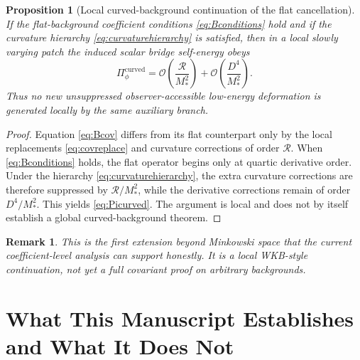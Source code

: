\documentclass[11pt]{article}
\newtheorem{proposition}{Proposition}
\newtheorem{remark}{Remark}
\begin{document}
\begin{proposition}[Local curved-background continuation of the flat cancellation]
If the flat-background coefficient conditions \eqref{eq:Bconditions} hold and if the curvature hierarchy \eqref{eq:curvaturehierarchy} is satisfied, then in a local slowly varying patch the induced scalar bridge self-energy obeys
\begin{equation}
\Pi_{\phi}^{\mathrm{curved}}
=
\mathcal O\!\left(\frac{\mathcal R}{M_*^2}\right)
+\mathcal O\!\left(\frac{D^4}{M_*^2}\right).
\label{eq:Picurved}
\end{equation}
Thus no new unsuppressed observer-accessible low-energy deformation is generated locally by the same auxiliary branch.
\end{proposition}

\begin{proof}
Equation \eqref{eq:Bcov} differs from its flat counterpart only by the local replacements \eqref{eq:covreplace} and curvature corrections of order \(\mathcal R\). When \eqref{eq:Bconditions} holds, the flat operator begins only at quartic derivative order. Under the hierarchy \eqref{eq:curvaturehierarchy}, the extra curvature corrections are therefore suppressed by \(\mathcal R/M_*^2\), while the derivative corrections remain of order \(D^4/M_*^2\). This yields \eqref{eq:Picurved}. The argument is local and does not by itself establish a global curved-background theorem.
\end{proof}

\begin{remark}
This is the first extension beyond Minkowski space that the current coefficient-level analysis can support honestly. It is a local WKB-style continuation, not yet a full covariant proof on arbitrary backgrounds.
\end{remark}

\section{What This Manuscript Establishes and What It Does Not}
\end{document}
